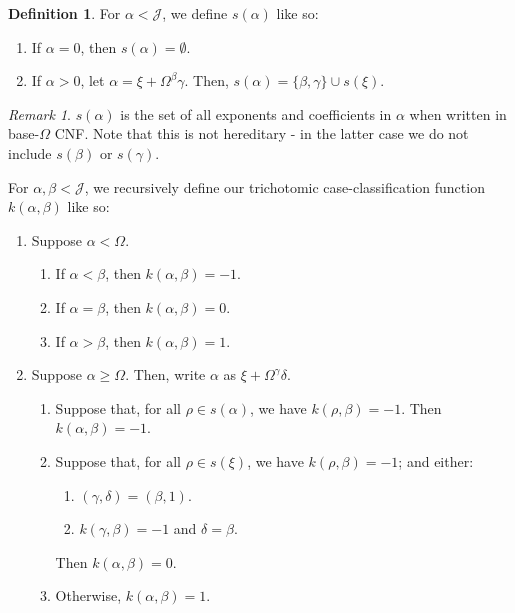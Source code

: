 \documentclass{article}
\theoremstyle{definition}
\newtheorem{definition}{Definition}[section]
\theoremstyle{plain}
\theoremstyle{plain}
\theoremstyle{plain}
\theoremstyle{plain}
\theoremstyle{remark}
\newtheorem{remark}{Remark}
\theoremstyle{remark}
\theoremstyle{remark}
\theoremstyle{plain}
\theoremstyle{plain}
\begin{document}
\begin{definition}
For $\alpha < \mathcal{J}$, we define $s(\alpha)$ like so:

\begin{enumerate}
    \item If $\alpha = 0$, then $s(\alpha) = \emptyset$.
    \item If $\alpha > 0$, let $\alpha = \xi + \Omega^\beta \gamma$. Then, $s(\alpha) = \{\beta, \gamma\} \cup s(\xi)$.
\end{enumerate}

\begin{remark}
$s(\alpha)$ is the set of all exponents and coefficients in $\alpha$ when written in base-$\Omega$ CNF. Note that this is not hereditary - in the latter case we do not include $s(\beta)$ or $s(\gamma)$.
\end{remark}

For $\alpha, \beta < \mathcal{J}$, we recursively define our trichotomic case-classification function $k(\alpha,\beta)$ like so:

\begin{enumerate}
    \item Suppose $\alpha < \Omega$.
    \begin{enumerate}
        \item If $\alpha < \beta$, then $k(\alpha,\beta) = -1$.
        \item If $\alpha = \beta$, then $k(\alpha,\beta) = 0$.
        \item If $\alpha > \beta$, then $k(\alpha,\beta) = 1$.
    \end{enumerate}
    \item Suppose $\alpha \geq \Omega$. Then, write $\alpha$ as $\xi + \Omega^\gamma \delta$.
    \begin{enumerate}
        \item Suppose that, for all $\rho \in s(\alpha)$, we have $k(\rho, \beta) = -1$. Then $k(\alpha,\beta) = -1$.
        \item Suppose that, for all $\rho \in s(\xi)$, we have $k(\rho, \beta) = -1$; and either:
        \begin{enumerate}
            \item $(\gamma, \delta) = (\beta, 1)$.
            \item $k(\gamma, \beta) = -1$ and $\delta = \beta$.
        \end{enumerate}
        Then $k(\alpha, \beta) = 0$.
        \item Otherwise, $k(\alpha,\beta) = 1$.
    \end{enumerate}
\end{enumerate}
\end{definition}
\end{document}
